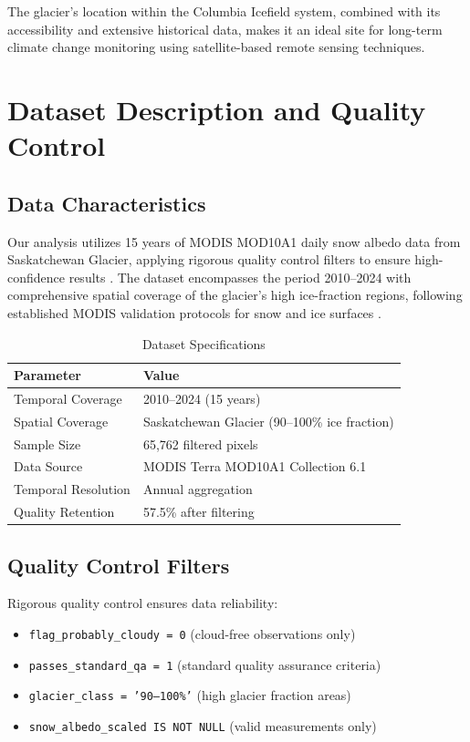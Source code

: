 \documentclass[12pt,a4paper]{article}
\begin{document}
The glacier's location within the Columbia Icefield system, combined with its accessibility and extensive historical data, makes it an ideal site for long-term climate change monitoring using satellite-based remote sensing techniques.

\section{Dataset Description and Quality Control}

\subsection{Data Characteristics}

Our analysis utilizes 15 years of MODIS MOD10A1 daily snow albedo data from Saskatchewan Glacier, applying rigorous quality control filters to ensure high-confidence results \cite{Burkhart2017ModisValidation, Bright2022MODISv61}. The dataset encompasses the period 2010--2024 with comprehensive spatial coverage of the glacier's high ice-fraction regions, following established MODIS validation protocols for snow and ice surfaces \cite{Stroeve2021MODISCloudMask}.

\begin{table}[H]
\centering
\caption{Dataset Specifications}
\label{tab:dataset_specs}
\begin{tabular}{@{}ll@{}}
\toprule
\textbf{Parameter} & \textbf{Value} \\
\midrule
Temporal Coverage & 2010--2024 (15 years) \\
Spatial Coverage & Saskatchewan Glacier (90--100\% ice fraction) \\
Sample Size & 65,762 filtered pixels \\
Data Source & MODIS Terra MOD10A1 Collection 6.1 \\
Temporal Resolution & Annual aggregation \\
Quality Retention & 57.5\% after filtering \\
\bottomrule
\end{tabular}
\end{table}

\subsection{Quality Control Filters}

Rigorous quality control ensures data reliability:
\begin{itemize}
    \item \texttt{flag\_probably\_cloudy = 0} (cloud-free observations only)
    \item \texttt{passes\_standard\_qa = 1} (standard quality assurance criteria)
    \item \texttt{glacier\_class = '90--100\%'} (high glacier fraction areas)
    \item \texttt{snow\_albedo\_scaled IS NOT NULL} (valid measurements only)
\end{itemize}
\end{document}
